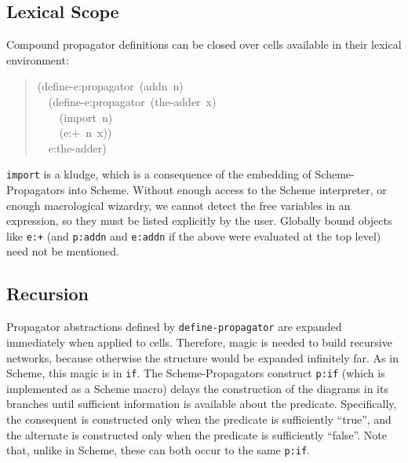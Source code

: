 \documentclass[12pt,letterpaper,english]{article}
\begin{document}

\hypertarget{lexical-scope}{}
\subsection{Lexical Scope}
\label{lexical-scope}

Compound propagator definitions can be closed over cells available in
their lexical environment:
\begin{quote}{\ttfamily \raggedright \noindent
(define-e:propagator~(addn~n)~\\
~~(define-e:propagator~(the-adder~x)~\\
~~~~(import~n)~\\
~~~~(e:+~n~x))~\\
~~e:the-adder)
}\end{quote}

\texttt{import} is a kludge, which is a consequence of the embedding of
Scheme-Propagators into Scheme.  Without enough access to the Scheme
interpreter, or enough macrological wizardry, we cannot detect the
free variables in an expression, so they must be listed explicitly by
the user.  Globally bound objects like \texttt{e:+} (and \texttt{p:addn} and
\texttt{e:addn} if the above were evaluated at the top level) need not be
mentioned.



\hypertarget{recursion}{}
\subsection{Recursion}
\label{recursion}

Propagator abstractions defined by \texttt{define-propagator} are expanded
immediately when applied to cells.  Therefore, magic is needed to
build recursive networks, because otherwise the structure would be
expanded infinitely far.  As in Scheme, this magic is in \texttt{if}.  The
Scheme-Propagators construct \texttt{p:if} (which is implemented as a
Scheme macro) delays the construction of the diagrams in its branches
until sufficient information is available about the predicate.
Specifically, the consequent is constructed only when the predicate is
sufficiently ``true'', and the alternate is constructed only when the
predicate is sufficiently ``false''.  Note that, unlike in Scheme, these
can both occur to the same \texttt{p:if}.
\end{document}
